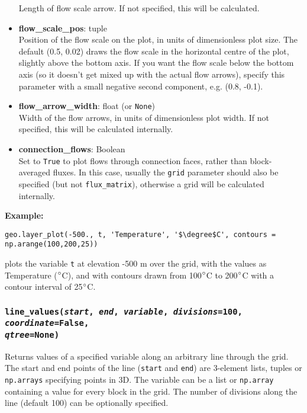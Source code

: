 \begin{itemize}
  Length of flow scale arrow.  If not specified, this will be calculated.
\item \textbf{flow\_scale\_pos}: tuple\\
  Position of the flow scale on the plot, in units of dimensionless plot size.  The default (0.5, 0.02) draws the flow scale in the horizontal centre of the plot, slightly above the bottom axis.  If you want the flow scale below the bottom axis (so it doesn't get mixed up with the actual flow arrows), specify this parameter with a small negative second component, e.g. (0.8, -0.1).
\item \textbf{flow\_arrow\_width}: float (or \texttt{None})\\
  Width of the flow arrows, in units of dimensionless plot width.  If not specified, this will be calculated internally.
\item \textbf{connection\_flows}: Boolean\\
  Set to \texttt{True} to plot flows through connection faces, rather than block-averaged fluxes.  In this case, usually the \texttt{grid} parameter should also be specified (but not \texttt{flux\_matrix}), otherwise a grid will be calculated internally.
\end{itemize}

\textbf{Example:}

\begin{lstlisting}
geo.layer_plot(-500., t, 'Temperature', '$\degree$C', contours = np.arange(100,200,25))
\end{lstlisting}

plots the variable \texttt{t} at elevation -500 m over the grid, with the values as Temperature ($\degree$C), and with contours drawn from 100$\degree$C to 200$\degree$C with a contour interval of 25$\degree$C.

\begin{snugshade}\subsubsection{\texttt{line\_values(\emph{start}, \emph{end}, \emph{variable}, \emph{divisions}=100, \emph{coordinate}=\texttt{False},\\
      \emph{qtree}=None)}}\end{snugshade}
\label{sec:mulgrid:line_values}

Returns values of a specified variable along an arbitrary line through the grid.  The start and end points of the line (\texttt{start} and \texttt{end}) are 3-element lists, tuples or \texttt{np.arrays} specifying points in 3D.  The variable can be a list or \texttt{np.array} containing a value for every block in the grid.  The number of divisions along the line (default 100) can be optionally specified.

